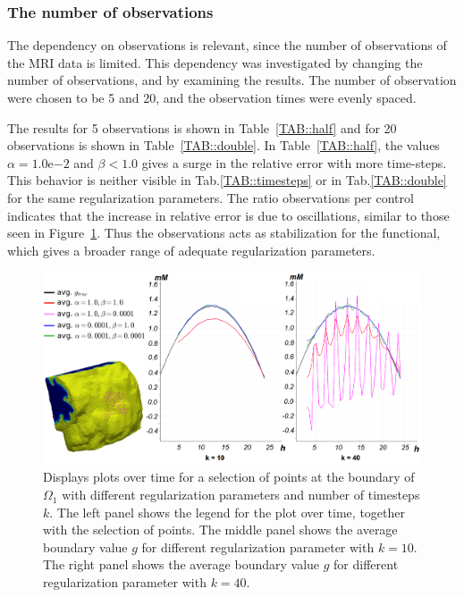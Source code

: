 \documentclass[11pt,a4paper]{article}
\begin{document}
\subsubsection{The number of observations}
The dependency on observations is relevant, since the number of observations of the MRI data is limited. This dependency was investigated by changing the number of observations, and by examining the results. The number of observation were chosen to be 5 and 20, and the observation times were evenly spaced. 


The results for 5 observations is shown in Table~\ref{TAB::half} and for 20 observations is shown in Table~\ref{TAB::double}. In Table~\ref{TAB::half}, the values $\alpha =1.0\mathrm{e}{-2}$ and $\beta<1.0$ gives a surge in the relative error with more time-steps. This behavior is neither visible in Tab.\ref{TAB::timesteps} or in  Tab.\ref{TAB::double} for the same regularization parameters. The ratio observations per control indicates that the increase in relative error is due to oscillations, similar to those seen in Figure~\ref{boundarycontrol}. Thus the observations acts as stabilization for the functional, which gives a broader range of adequate regularization parameters.





\begin{figure}
\centering
\includegraphics[scale=0.21]{boundary_control.png}  
\caption{ Displays plots over time for a selection of points at the boundary of $\Omega_1$ with different regularization parameters and number of timesteps $k$. The left panel shows the legend for the plot over time, together with the selection of points. The middle panel shows the average boundary value $g$ for different regularization parameter with $k=10$. The right panel shows the average boundary value $g$ for different regularization parameter with $k=40$.  }
\label{boundarycontrol}
\end{figure}
\end{document}
